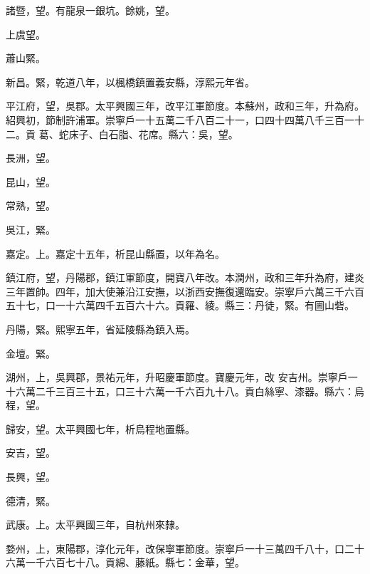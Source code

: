 \begin{pinyinscope}
 諸暨，望。有龍泉一銀坑。餘姚，望。



 上虞望。



 蕭山緊。



 新昌。緊，乾道八年，以楓橋鎮置義安縣，淳熙元年省。



 平江府，望，吳郡。太平興國三年，改平江軍節度。本蘇州，政和三年，升為府。紹興初，節制許浦軍。崇寧戶一十五萬二千八百二十一，口四十四萬八千三百一十二。貢
 葛、蛇床子、白石脂、花席。縣六：吳，望。



 長洲，望。



 昆山，望。



 常熟，望。



 吳江，緊。



 嘉定。上。嘉定十五年，析昆山縣置，以年為名。



 鎮江府，望，丹陽郡，鎮江軍節度，開寶八年改。本潤州，政和三年升為府，建炎三年置帥。四年，加大使兼沿江安撫，以浙西安撫復還臨安。崇寧戶六萬三千六百五十七，口一十六萬四千五百六十六。貢羅、綾。縣三：丹徒，緊。有圌山砦。



 丹陽，緊。熙寧五年，省延陵縣為鎮入焉。



 金壇。緊。



 湖州，上，吳興郡，景祐元年，升昭慶軍節度。寶慶元年，改
 安吉州。崇寧戶一十六萬二千三百三十五，口三十六萬一千六百九十八。貢白絲寧、漆器。縣六：烏程，望。



 歸安，望。太平興國七年，析烏程地置縣。



 安吉，望。



 長興，望。



 德清，緊。



 武康。上。太平興國三年，自杭州來隸。



 婺州，上，東陽郡，淳化元年，改保寧軍節度。崇寧戶一十三萬四千八十，口二十六萬一千六百七十八。貢綿、藤紙。縣七：金華，望。




\end{pinyinscope}
